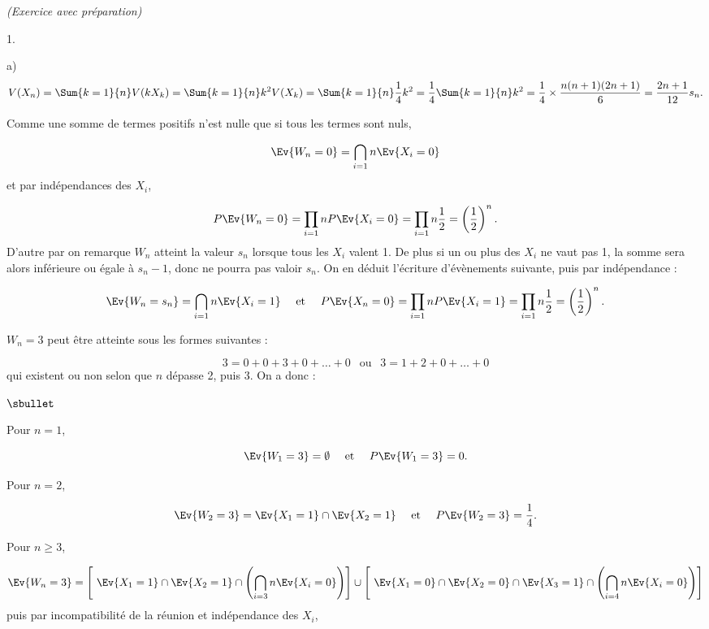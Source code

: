 \documentclass[11pt]{article}%
\begin{document}
\begin{exercice}{\it (Exercice avec préparation)}
\begin{noliste}{1.}
\begin{noliste}{a)}
\[
 V ( X_{n} ) = \Sum{k = 1}{n} V ( k X_{k} ) = \Sum{k = 1}{n} k^{2} V (
X_{k}
 ) = \Sum{k = 1}{n} \frac{ 1 }{ 4 } k^{2} = \frac{ 1 }{ 4 }
 \Sum{k = 1}{n} k^{2} = \frac{ 1 }{ 4 } \times \frac{ n (n + 1 ) (2n +
1
 ) }{ 6 } = \frac{ 2n + 1 }{ 12 } s_{n}.
\]

 \item Comme une somme de termes positifs n'est nulle que si tous
 les termes sont nuls,
 
\[
 \Ev{W_{n} = 0} = \bigcap\limits_{i = 1}{n} \Ev{X_{i} = 0}
\]
 et par indépendances des $X_{i}$,
 
\[
 P \Ev{ W_{n} = 0 } = \prod\limits_{i = 1}{n} P \Ev{X_{i} = 0 } = 
 \prod\limits_{i = 1}{n} \frac{1}{2} = \left( \frac{ 1 }{ 2 }
 \right)^{n}.
\]
 D'autre par on remarque $W_{n}$ atteint la valeur $s_{n}$ lorsque
 tous les $X_{i}$ valent 1. De plus si un ou plus des $X_{i}$ ne vaut
 pas 1, la somme sera alors inférieure ou égale à $s_{n} - 1$, donc
 ne pourra pas valoir $s_{n}$. On en déduit l'écriture d'évènements
 suivante, puis par indépendance :
 
\[
 \Ev{W_{n} = s_{n} } = \bigcap\limits_{i = 1}{n} \Ev{X_{i} = 1} \ \ \
 \text{ et } \ \ \ P \Ev{ X_{n} = 0 } = \prod\limits_{i = 1}{n} P
 \Ev{X_{i} = 1} = \prod\limits_{i = 1}{n} \frac{1}{2} = \left( \frac{
 1 }{ 2 } \right)^{n}.
\]
 
 \item $W_{n} = 3$ peut être atteinte sous les formes suivantes :
 
\[
 3 = 0 + 0 + 3 + 0 + \dots + 0 \ \ \text{ ou } \ \ 3 = 1 + 2 + 0
 + \dots + 0
\]
 qui existent ou non selon que $n$ dépasse 2, puis 3. On a donc : 
 \begin{noliste}{$\sbullet$}
 \item Pour $n = 1$,
 
\[
 \Ev{W_{1} = 3} = \emptyset \ \ \ \text{ et } \ \ \ P \Ev{W_{1} = 3 } =
0. 
\]
 
 \item Pour $n = 2$,
 
\[
 \Ev{W_{2} = 3 } = \Ev{X_{1} = 1 } \cap \Ev{X_{2} = 1 } \ \ \ \text{
 et } \ \ \ P \Ev{ W_{2} = 3 } = \frac{ 1 }{ 4 }.
\]

 \item Pour $n \geq 3$,
 
\[
 \Ev{W_{n} = 3 } = \left[ \ \Ev{X_{1} = 1 } \cap \Ev{X_{2} = 1 } \cap
 \left( \bigcap\limits_{i = 3}{n} \Ev{X_{i} = 0} \right) \right]
 \cup \left[ \ \Ev{X_{1} = 0 } \cap \Ev{X_{2} = 0} \cap \Ev{X_{3} = 1}
 \cap \left( \bigcap\limits_{i = 4}{n} \Ev{X_{i} = 0 } \right)
 \right]
\]
 puis par incompatibilité de la réunion et indépendance des
 $X_{i}$,
 

\end{noliste}
\end{noliste}
\end{noliste}
\end{exercice}
\end{document}
